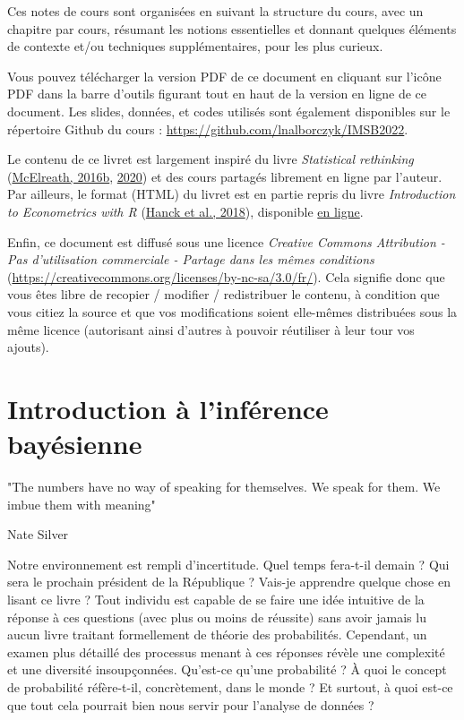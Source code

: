 \documentclass[
  a4paper,11pt,twoside,onecolumn,openright,final,oldfontcommands]{memoir}
\theoremstyle{definition}
\theoremstyle{definition}
\theoremstyle{definition}
\theoremstyle{definition}
\theoremstyle{remark}
\begin{document}
Ces notes de cours sont organisées en suivant la structure du cours, avec un chapitre par cours, résumant les notions essentielles et donnant quelques éléments de contexte et/ou techniques supplémentaires, pour les plus curieux.

Vous pouvez télécharger la version PDF de ce document en cliquant sur l'icône PDF dans la barre d'outils figurant tout en haut de la version en ligne de ce document. Les slides, données, et codes utilisés sont également disponibles sur le répertoire Github du cours : \url{https://github.com/lnalborczyk/IMSB2022}.

Le contenu de ce livret est largement inspiré du livre \emph{Statistical rethinking} (\protect\hyperlink{ref-mcelreath_statistical_2016}{McElreath, 2016b}, \protect\hyperlink{ref-mcelreath_statistical_2020}{2020}) et des cours partagés librement en ligne par l'auteur. Par ailleurs, le format (HTML) du livret est en partie repris du livre \emph{Introduction to Econometrics with R} (\protect\hyperlink{ref-hanck_introduction_2018}{Hanck et al., 2018}), disponible \href{https://bookdown.org/machar1991/ITER/}{en ligne}.

Enfin, ce document est diffusé sous une licence \emph{Creative Commons Attribution - Pas d'utilisation commerciale - Partage dans les mêmes conditions} (\url{https://creativecommons.org/licenses/by-nc-sa/3.0/fr/}). Cela signifie donc que vous êtes libre de recopier / modifier / redistribuer le contenu, à condition que vous citiez la source et que vos modifications soient elle-mêmes distribuées sous la même licence (autorisant ainsi d'autres à pouvoir réutiliser à leur tour vos ajouts).

\hypertarget{introduction}{%
\chapter{Introduction à l'inférence bayésienne}\label{introduction}}


\epigraph{"The numbers have no way of speaking for themselves. We speak for them. We imbue them with meaning"}{Nate Silver}

Notre environnement est rempli d'incertitude. Quel temps fera-t-il demain ? Qui sera le prochain président de la République ? Vais-je apprendre quelque chose en lisant ce livre ? Tout individu est capable de se faire une idée intuitive de la réponse à ces questions (avec plus ou moins de réussite) sans avoir jamais lu aucun livre traitant formellement de théorie des probabilités. Cependant, un examen plus détaillé des processus menant à ces réponses révèle une complexité et une diversité insoupçonnées. Qu'est-ce qu'une probabilité ? À quoi le concept de probabilité réfère-t-il, concrètement, dans le monde ? Et surtout, à quoi est-ce que tout cela pourrait bien nous servir pour l'analyse de données ?
\end{document}
